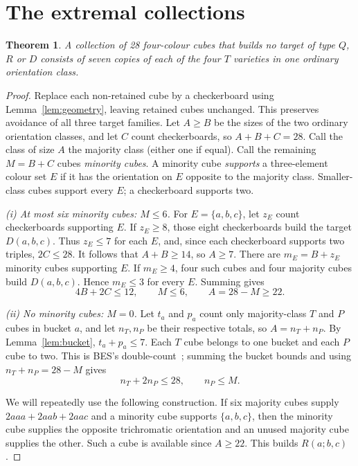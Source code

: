 \documentclass[11pt]{article}
\newtheorem{theorem}{Theorem}
\theoremstyle{remark}
\begin{document}
\section{The extremal collections}
\begin{theorem}\label{thm:classification}
A collection of 28 four-colour cubes that builds no target of type $Q$,
$R$ or $D$ consists of seven copies of each of the four $T$ varieties
in one ordinary orientation class.
\end{theorem}
\begin{proof}
Replace each non-retained cube by a checkerboard using
Lemma~\ref{lem:geometry}, leaving retained cubes unchanged. This preserves
avoidance of all three target families.
Let $A\ge B$ be the sizes of the two ordinary orientation classes, and
let $C$ count checkerboards, so $A+B+C=28$. Call the class of size $A$
the majority class (either one if equal). Call the remaining $M=B+C$ cubes \emph{minority cubes}.
A minority cube \emph{supports} a three-element colour set $E$ if it has
the orientation on $E$ opposite to the majority class. Smaller-class
cubes support every $E$; a checkerboard supports two.

\smallskip\noindent\emph{(i) At most six minority cubes: $M\le6$.}
For $E=\{a,b,c\}$, let $z_E$ count checkerboards supporting $E$.
If $z_E\ge8$, those eight checkerboards build the
target $D(a,b,c)$. Thus $z_E\le7$ for each
$E$, and, since each checkerboard supports two triples, $2C\le28$.
It follows that $A+B\ge14$, so $A\ge7$. There are $m_E=B+z_E$
minority cubes supporting $E$. If $m_E\ge4$, four such cubes and four majority cubes
build $D(a,b,c)$. Hence
$m_E\le3$ for every $E$. Summing gives
\begin{equation}\label{eq:minority}
 4B+2C\le12,\qquad M\le6,\qquad A=28-M\ge22.
\end{equation}

\smallskip\noindent\emph{(ii) No minority cubes: $M=0$.}
Let $t_a$ and $p_a$ count only majority-class $T$ and $P$
cubes in bucket $a$, and let $n_T,n_P$ be their respective totals, so
$A=n_T+n_P$. By Lemma~\ref{lem:bucket}, $t_a+p_a\le7$.
Each $T$ cube belongs to one bucket and each $P$ cube to two. This is BES's
double-count~\cite[equation (1)]{BES}; summing the bucket bounds and using
$n_T+n_P=28-M$ gives
\begin{equation}\label{eq:buckets}
 n_T+2n_P\le28,\qquad n_P\le M.
\end{equation}

We will repeatedly use the following construction. If six majority cubes
supply $2aaa+2aab+2aac$ and a minority cube supports $\{a,b,c\}$, then
the minority cube supplies the opposite trichromatic orientation and an
unused majority cube supplies the other. Such a cube is available since
$A\ge22$. This builds $R(a;b,c)$.


\end{proof}
\end{document}
